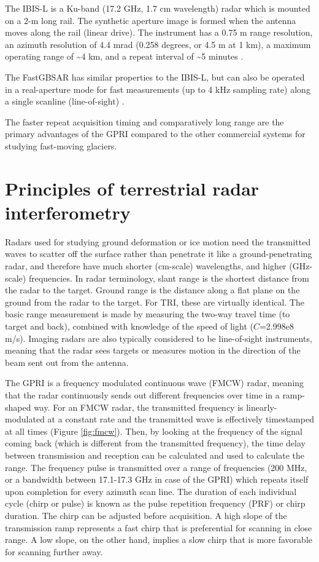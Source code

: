 The IBIS-L is a Ku-band (17.2 GHz, 1.7 cm wavelength) radar which is mounted on a 2-m long rail. The synthetic aperture image is formed when the antenna moves along the rail (linear drive). The instrument has a 0.75 m range resolution, an azimuth resolution of 4.4 mrad (0.258 degrees, or 4.5 m at 1 km), a maximum operating range of \textasciitilde4 km, and a repeat interval of \textasciitilde5 minutes  \citep{schulz2012kinematics}.

The FastGBSAR has similar properties to the IBIS-L, but can also be operated in a real-aperture mode for fast measurements (up to 4 kHz sampling rate) along a single scanline (line-of-sight) \citep{roedelsperger2013novel,fastgb}.

The faster repeat acquisition timing and comparatively long range are the primary advantages of the GPRI compared to the other commercial systems for studying fast-moving glaciers.

\section{Principles of terrestrial radar interferometry}
Radars used for studying ground deformation or ice motion need the transmitted waves to scatter off the surface rather than penetrate it like a ground-penetrating radar, and therefore have much shorter (cm-scale) wavelengths, and higher (GHz-scale) frequencies. In radar terminology, slant range is the shortest distance from the radar to the target. Ground range is the distance along a flat plane on the ground from the radar to the target. For TRI, these are virtually identical. The basic range measurement is made by measuring the two-way travel time (to target and back), combined with knowledge of the speed of light ($C$=2.998e8 m/s). Imaging radars are also typically considered to be line-of-sight instruments, meaning that the radar sees targets or measures motion in the direction of the beam sent out from the antenna. 


The GPRI is a frequency modulated continuous wave (FMCW) radar, meaning that the radar continuously sends out different frequencies over time in a ramp-shaped way. For an FMCW radar, the transmitted frequency is linearly-modulated at a constant rate and the transmitted wave is effectively timestamped at all times (Figure \ref{fig:fmcw}). Then, by looking at the frequency of the signal coming back (which is different from the transmitted frequency), the time delay between transmission and reception can be calculated and used to calculate the range. The frequency pulse is transmitted over a range of frequencies (200 MHz, or a bandwidth between 17.1-17.3 GHz in case of the GPRI) which repeats itself upon completion for every azimuth scan line. The duration of each individual cycle (chirp or pulse) is known as the pulse repetition frequency (PRF) or chirp duration. The chirp can be adjusted before acquisition. A high slope of the transmission ramp represents a fast chirp that is preferential for scanning in close range. A low slope, on the other hand, implies a slow chirp that is more favorable for scanning further away. 

